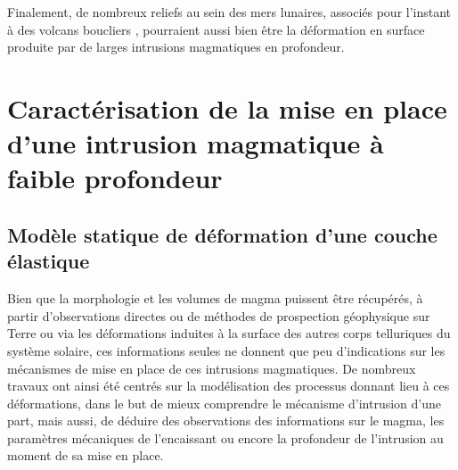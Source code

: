 Finalement, de  nombreux reliefs au  sein des mers  lunaires, associés
pour   l'instant  à   des  volcans   boucliers  \citep{Spudis:2013fr},
pourraient aussi bien  être la déformation en surface  produite par de
larges intrusions magmatiques en profondeur.

\section{Caractérisation  de   la  mise  en  place   d'une  intrusion
  magmatique à faible profondeur}
\label{C1-sec:orign-theor-fram}

\subsection{Modèle statique de déformation d'une couche élastique}
\label{C1-sec:model-statique-de}

Bien  que  la  morphologie  et  les volumes  de  magma  puissent  être
récupérés,  à  partir  d'observations   directes  ou  de  méthodes  de
prospection géophysique sur  Terre ou via les  déformations induites à
la  surface  des autres  corps  telluriques  du système  solaire,  ces
informations  seules   ne  donnent  que  peu   d'indications  sur  les
mécanismes  de  mise  en  place de  ces  intrusions  magmatiques.   De
nombreux  travaux  ont  ainsi  été centrés  sur  la  modélisation  des
processus  donnant lieu  à  ces  déformations, dans  le  but de  mieux
comprendre le mécanisme d'intrusion d'une part, mais aussi, de déduire
des  observations  des  informations  sur  le  magma,  les  paramètres
mécaniques de l'encaissant  ou encore la profondeur  de l'intrusion au
moment de sa mise en place.

